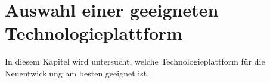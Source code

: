 \documentclass[ngerman]{article}
\begin{document}
    \newpage\noindent
    \section{Auswahl einer geeigneten Technologieplattform}
    \label{AuswahlTechnologieplattform}
    In diesem Kapitel wird untersucht, welche Technologieplattform für die Neuentwicklung am besten geeignet ist.
\end{document}
